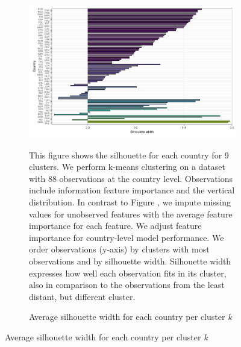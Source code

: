  \begin{figure}[ht!]\ContinuedFloat
   \centering
   \begin{subfigure}[b]{\textwidth}
   \centering
   \includegraphics{Figures_Appendix/Figure_Silhouette_Clusters_3.pdf}
   \caption{Average silhouette width for each country per cluster \textit{k}} \label{fig:G2_silhouette_3}
   \begin{subcaption2}
     This figure shows the silhouette for each country for 9 clusters. We perform k-means clustering on a dataset with 88 observations at the country level. Observations include information feature importance and the vertical distribution. In contrast to Figure , we impute missing values for unobserved features with the average feature importance for each feature. We adjust feature importance for country-level model performance.  We order observations (y-axis) by clusters with most observations and by silhouette width. Silhouette width expresses how well each observation fits in its cluster, also in comparison to the observations from the least distant, but different cluster.
   \end{subcaption2}
   \end{subfigure}
 \end{figure}
 \clearpage